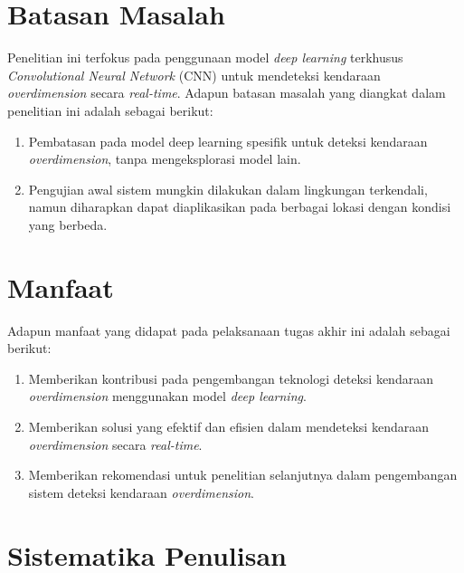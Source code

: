 \section{Batasan Masalah}
\label{sec:batasanmasalah}

Penelitian ini terfokus pada penggunaan model \emph{deep learning} terkhusus \emph{Convolutional Neural Network} (CNN) untuk mendeteksi kendaraan \emph{overdimension} secara \emph{real-time}. Adapun batasan masalah yang diangkat dalam penelitian ini adalah sebagai berikut:

\begin{enumerate}[nolistsep]

  \item Pembatasan pada model deep learning spesifik untuk deteksi kendaraan \emph{overdimension}, tanpa mengeksplorasi model lain.
  
  \item Pengujian awal sistem mungkin dilakukan dalam lingkungan terkendali, namun diharapkan dapat diaplikasikan pada berbagai lokasi dengan kondisi yang berbeda.
  
\end{enumerate}

\section{Manfaat}
\label{sec:manfaatpenulisan}

Adapun manfaat yang didapat pada pelaksanaan tugas akhir ini adalah sebagai berikut:

\begin{enumerate}[nolistsep]

  \item Memberikan kontribusi pada pengembangan teknologi deteksi kendaraan \emph{overdimension} menggunakan model \emph{deep learning}.
  
  \item Memberikan solusi yang efektif dan efisien dalam mendeteksi kendaraan \emph{overdimension} secara \emph{real-time}.
  
  \item Memberikan rekomendasi untuk penelitian selanjutnya dalam pengembangan sistem deteksi kendaraan \emph{overdimension}.
  
\end{enumerate}

\section{Sistematika Penulisan}
\label{sec:sistematikapenulisan
}

